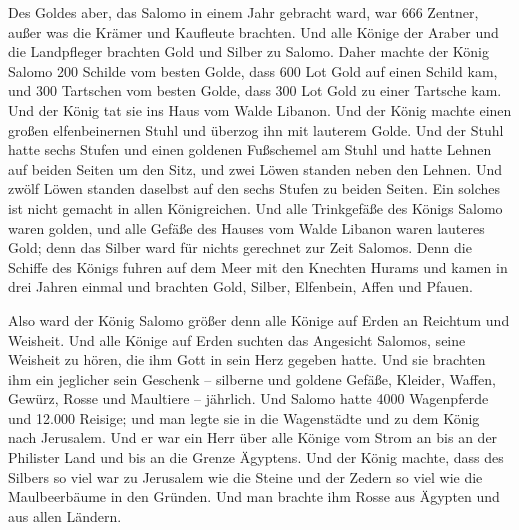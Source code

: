  Des Goldes aber, das Salomo in einem Jahr gebracht ward,
war 666 Zentner,  außer was die Krämer und Kaufleute
brachten. Und alle Könige der Araber und die Landpfleger brachten Gold
und Silber zu Salomo.  Daher machte der König Salomo 200
Schilde vom besten Golde, dass 600 Lot Gold auf einen Schild kam,
 und 300 Tartschen vom besten Golde, dass 300 Lot Gold zu
einer Tartsche kam.  Und der König tat sie ins Haus vom
Walde Libanon. Und der König machte einen großen elfenbeinernen Stuhl
und überzog ihn mit lauterem Golde.  Und der Stuhl hatte
sechs Stufen und einen goldenen Fußschemel am Stuhl und hatte Lehnen auf
beiden Seiten um den Sitz, und zwei Löwen standen neben den Lehnen.
 Und zwölf Löwen standen daselbst auf den sechs Stufen zu
beiden Seiten. Ein solches ist nicht gemacht in allen Königreichen.
 Und alle Trinkgefäße des Königs Salomo waren golden, und
alle Gefäße des Hauses vom Walde Libanon waren lauteres Gold; denn das
Silber ward für nichts gerechnet zur Zeit Salomos.  Denn
die Schiffe des Königs fuhren auf dem Meer mit den Knechten Hurams und
kamen in drei Jahren einmal und brachten Gold, Silber, Elfenbein, Affen
und Pfauen.

 Also ward der König Salomo größer denn alle Könige auf
Erden an Reichtum und Weisheit.  Und alle Könige auf Erden
suchten das Angesicht Salomos, seine Weisheit zu hören, die ihm Gott in
sein Herz gegeben hatte.  Und sie brachten ihm ein
jeglicher sein Geschenk -- silberne und goldene Gefäße, Kleider, Waffen,
Gewürz, Rosse und Maultiere -- jährlich.  Und Salomo hatte
4000 Wagenpferde und 12.000 Reisige; und man legte sie in die
Wagenstädte und zu dem König nach Jerusalem.  Und er war
ein Herr über alle Könige vom Strom an bis an der Philister Land und bis
an die Grenze Ägyptens.  Und der König machte, dass des
Silbers so viel war zu Jerusalem wie die Steine und der Zedern so viel
wie die Maulbeerbäume in den Gründen.  Und man brachte ihm
Rosse aus Ägypten und aus allen Ländern.

